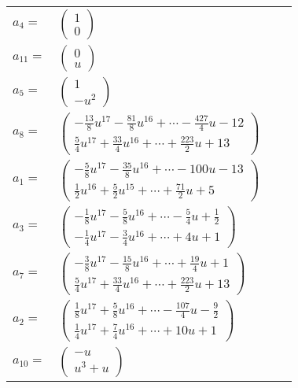 \documentclass[1p]{elsarticle_modified}
\theoremstyle{definition}
\begin{document}
\begin{tabular}{m{7pt} m{180pt} m{7pt} m{180pt} }
\flushright $a_{4}=$&$\begin{pmatrix}1\\0\end{pmatrix}$ \\
\flushright $a_{11}=$&$\begin{pmatrix}0\\u\end{pmatrix}$ \\
\flushright $a_{5}=$&$\begin{pmatrix}1\\- u^2\end{pmatrix}$ \\
\flushright $a_{8}=$&$\begin{pmatrix}-\frac{13}{8} u^{17}-\frac{81}{8} u^{16}+\cdots-\frac{427}{4} u-12\\\frac{5}{4} u^{17}+\frac{33}{4} u^{16}+\cdots+\frac{223}{2} u+13\end{pmatrix}$ \\
\flushright $a_{1}=$&$\begin{pmatrix}-\frac{5}{8} u^{17}-\frac{35}{8} u^{16}+\cdots-100 u-13\\\frac{1}{2} u^{16}+\frac{5}{2} u^{15}+\cdots+\frac{71}{2} u+5\end{pmatrix}$ \\
\flushright $a_{3}=$&$\begin{pmatrix}-\frac{1}{8} u^{17}-\frac{5}{8} u^{16}+\cdots-\frac{5}{4} u+\frac{1}{2}\\-\frac{1}{4} u^{17}-\frac{3}{4} u^{16}+\cdots+4 u+1\end{pmatrix}$ \\
\flushright $a_{7}=$&$\begin{pmatrix}-\frac{3}{8} u^{17}-\frac{15}{8} u^{16}+\cdots+\frac{19}{4} u+1\\\frac{5}{4} u^{17}+\frac{33}{4} u^{16}+\cdots+\frac{223}{2} u+13\end{pmatrix}$ \\
\flushright $a_{2}=$&$\begin{pmatrix}\frac{1}{8} u^{17}+\frac{5}{8} u^{16}+\cdots-\frac{107}{4} u-\frac{9}{2}\\\frac{1}{4} u^{17}+\frac{7}{4} u^{16}+\cdots+10 u+1\end{pmatrix}$ \\
\flushright $a_{10}=$&$\begin{pmatrix}- u\\u^3+u\end{pmatrix}$ \\

\end{tabular}
\end{document}

